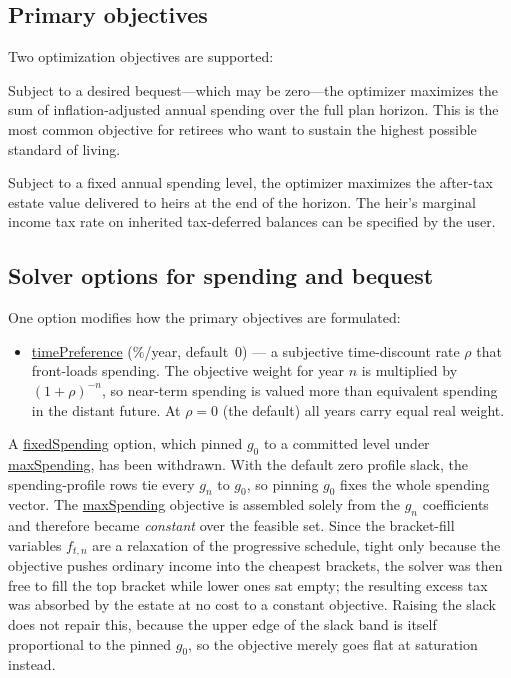 \documentclass[fleqn,12pt]{report}
\newcommand{\code}[1]{\url{#1}}
\begin{document}
\subsection*{Primary objectives}

Two optimization objectives are supported:

\begin{description}[nosep, leftmargin=2em, style=nextline]
\item[Maximize net spending.]
  Subject to a desired bequest---which may be zero---the optimizer
  maximizes the sum of inflation-adjusted annual spending over the full
  plan horizon.
  This is the most common objective for retirees who want to sustain the
  highest possible standard of living.

\item[Maximize bequest.]
  Subject to a fixed annual spending level, the optimizer maximizes the
  after-tax estate value delivered to heirs at the end of the horizon.
  The heir's marginal income tax rate on inherited tax-deferred balances
  can be specified by the user.
\end{description}

\subsection*{Solver options for spending and bequest}
\label{sec:solver-options-objectives}

One option modifies how the primary objectives are formulated:
\begin{itemize}[nosep]
  \item \code{timePreference} (\%/year, default~0) --- a subjective time-discount rate
    $\rho$ that front-loads spending.
    The objective weight for year $n$ is multiplied by
    $(1+\rho)^{-n}$, so near-term spending is valued more than equivalent
    spending in the distant future.
    At $\rho=0$ (the default) all years carry equal real weight.
\end{itemize}

A \code{fixedSpending} option, which pinned $g_0$ to a committed level under
\code{maxSpending}, has been withdrawn.
With the default zero profile slack, the spending-profile rows tie every $g_n$ to $g_0$,
so pinning $g_0$ fixes the whole spending vector.
The \code{maxSpending} objective is assembled solely from the $g_n$ coefficients and
therefore became \emph{constant} over the feasible set.
Since the bracket-fill variables $f_{t,n}$ are a relaxation of the progressive schedule,
tight only because the objective pushes ordinary income into the cheapest brackets, the
solver was then free to fill the top bracket while lower ones sat empty; the resulting
excess tax was absorbed by the estate at no cost to a constant objective.
Raising the slack does not repair this, because the upper edge of the slack band is itself
proportional to the pinned $g_0$, so the objective merely goes flat at saturation instead.
\end{document}
